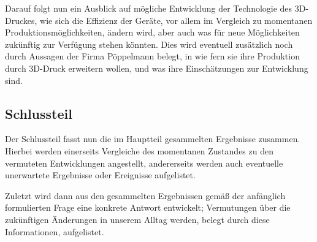 \documentclass[a4paper, 11pt]{article}
\begin{document}
Darauf folgt nun ein Ausblick auf mögliche Entwicklung der Technologie des 3D-Druckes, wie sich die Effizienz der Geräte, vor allem im Vergleich zu momentanen Produktionsmöglichkeiten, ändern wird, aber auch was für neue Möglichkeiten zukünftig zur Verfügung stehen könnten.
Dies wird eventuell zusätzlich noch durch Aussagen der Firma Pöppelmann belegt, in wie fern sie ihre Produktion durch 3D-Druck erweitern wollen, und was ihre Einschätzungen zur Entwicklung sind.

\subsection{Schlussteil}
Der Schlussteil fasst nun die im Hauptteil gesammelten Ergebnisse zusammen. Hierbei werden einerseits Vergleiche des momentanen Zustandes zu den vermuteten Entwicklungen angestellt, andererseits werden auch eventuelle unerwartete Ergebnisse oder Ereignisse aufgelistet.

Zuletzt wird dann aus den gesammelten Ergebnissen gemäß der anfänglich formulierten Frage eine konkrete Antwort entwickelt; Vermutungen über die zukünftigen Änderungen in unserem Alltag werden, belegt durch diese Informationen, aufgelistet.
\end{document}
